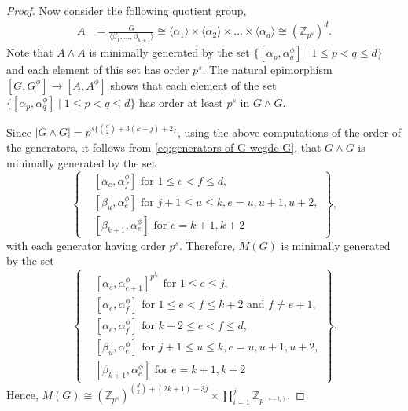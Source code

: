 \documentclass[preprint,sort&compress,12pt]{elsarticle}
\numberwithin{equation}{section}
\theoremstyle{definition}
\newcommand{\Z}{\mathbb{Z}}
\begin{document}
\begin{proof}
Now consider the following quotient group, 
\begin{align*}
  A &= \frac{G}{\langle \beta_1, \ldots,\beta_{k+1}\rangle}  \cong \langle \alpha_1\rangle \times \langle \alpha_2 \rangle \times \ldots\times \langle \alpha_d \rangle \cong (\Z_{p^s})^d.
\end{align*}
Note that $A \wedge A$ is minimally generated by the set ${\{[\alpha_p,\alpha_{q}^{\phi}]\mid 1\le p <q \le d\}}$ and each element of this set  has order $p^s$. The natural epimorphism
 ${[G,G^\phi] \to [A,A^\phi]}$
 shows that each element of the set $\{[\alpha_p,\alpha_q^{\phi}]\mid 1 \le p <q \le d\}$  has order at least $p^s$ in $G \wedge G$. 
 
Since $|G \wedge G|=p^{s\{\binom{d}{2}+3(k-j)+2\}}$, using the above computations of the order of the generators, it follows  from \eqref{eq:generators of G wegde G}, that $G \wedge G$ is minimally generated by the set
\[\left\{ 
\begin{array}{cl}
	&  [\alpha_e,\alpha_f^{\phi}] \text{ for }  1\le e <f \le d,   \\
	&  [\beta_u,\alpha_e^{\phi}]\text{ for } j+1\le u\le k, e=u,u+1,u+2, \\
     &  [\beta_{k+1},\alpha_e^{\phi}] \text{ for } e=k+1,k+2 
\end{array}
\right\},\]
with each generator having order $p^s$. Therefore, $M(G)$ is minimally generated by the set
\[\left\{ 
    \begin{array}{cl}
    &  [\alpha_e,\alpha_{e+1}^{\phi}]^{p^{t_e}} \text{ for } 1 \le e \le j,\\
                 &  [\alpha_e,\alpha_f^{\phi}] \text{ for } 1 \le e < f \le k+2 \text{ and } f \neq e+1, \\
                 & [\alpha_e,\alpha_f^{\phi}] \text{ for } k+2 \le e < f \le d,\\
                 & [\beta_u,\alpha_e^{\phi}]\text{ for } j+1\le u\le k, e=u,u+1,u+2,\\
                 & [\beta_{k+1},\alpha_e^{\phi}] \text{ for } e=k+1,k+2
\end{array}
\right\}.\]
Hence, $M(G) \cong (\Z_{p^s})^{\binom{d}{2}+(2k+1)-3j} \times \prod\limits_{i=1}^{j}\Z_{p^{(s-t_i)}}$.


\end{proof}
\end{document}

